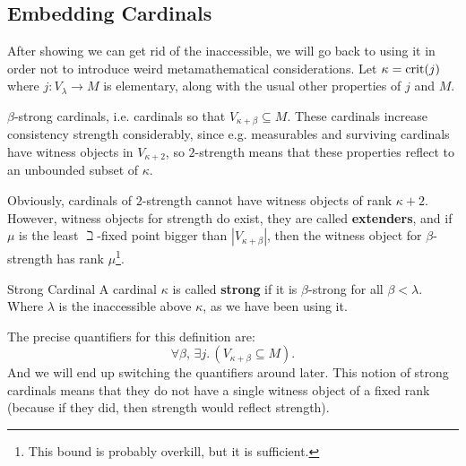 \documentclass{article}
\begin{document}
\subsection{Embedding Cardinals}
After showing we can get rid of the inaccessible, we will go back to using it in order not to introduce weird metamathematical considerations. \gap 
Let $\kappa = \operatorname{crit}(j)$ where $j : V_{\lambda} \to M$ is elementary, along with the usual other properties of $j$ and $M$.
\begin{ex*}
    $\beta$-strong cardinals, i.e. cardinals so that $V_{\kappa + \beta} \subseteq M$. These cardinals increase consistency strength considerably, since e.g. measurables and surviving cardinals have witness objects in $V_{\kappa+2}$, so $2$-strength means that these properties reflect to an unbounded subset of $\kappa$. 
\end{ex*}
\begin{remark*}
    Obviously, cardinals of $2$-strength cannot have witness objects of rank $\kappa + 2$. However, witness objects for strength do exist, they are called \textbf{extenders}, and if $\mu$ is the least $\beth$-fixed point bigger than $|V_{\kappa+\beta}|$, then the witness object for $\beta$-strength has rank $\mu$\footnote{This bound is probably overkill, but it is sufficient.}.
\end{remark*}
\begin{fancydefine}{Strong Cardinal}
    A cardinal $\kappa$ is called \textbf{strong} if it is $\beta$-strong for all $\beta < \lambda$. Where $\lambda$ is the inaccessible above $\kappa$, as we have been using it.
\end{fancydefine}
\begin{remark*}
    The precise quantifiers for this definition are: \[ \forall \beta, \, \exists j. \, (V_{\kappa + \beta} \subseteq M).\] And we will end up switching the quantifiers around later. This notion of strong cardinals means that they do not have a single witness object of a fixed rank (because if they did, then strength would reflect strength). 
\end{remark*}
\end{document}

